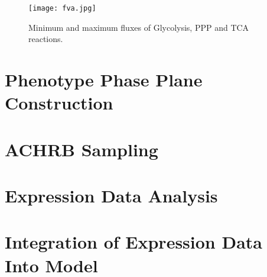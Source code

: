 \begin{figure}[H]
\begin{center}
\texttt{[image: fva.jpg]}
\end{center}
\caption[Minimum and maximum fluxes of Glycolysis, PPP and TCA reactions]{Minimum and maximum fluxes of Glycolysis, PPP and TCA reactions.}
\label{fig:fva}
\end{figure}

\section{Phenotype Phase Plane Construction}
\section{ACHRB Sampling}
\section{Expression Data Analysis}
\section{Integration of Expression Data Into Model}
